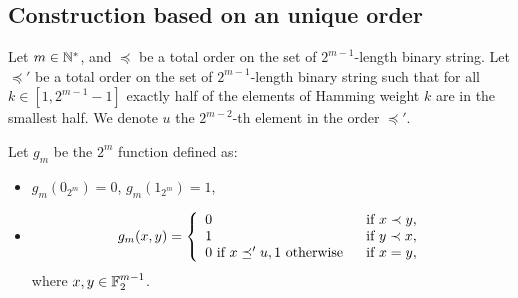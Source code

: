 \documentclass[11pt]{llncs}
\begin{document}
\subsection{Construction based on an unique order}

\begin{definition}\label{def:orderWPB2}
	Let $m\in \mathbb{N}^*$, and $\preceq$ be a total order on the set of $2^{m-1}$-length binary string. 
	Let $\preceq'$ be a total order on the set of $2^{m-1}$-length binary string such that for all $k\in [1,2^{m-1}-1]$ exactly half of the elements of Hamming weight $k$ are in the smallest half. 
	We denote $u$ the $2^{m-2}$-th element in the order $\preceq'$.
	
	Let $g_m$ be the $2^m$ function defined as:
	\begin{itemize}
		\item $g_m(0_{2^m})=0$, $g_m(1_{2^m})=1$,
		\item 	\[g_m(x,y)= \left \{
		\begin{array}{l l}
		0   & \text{ if }  x \prec y,\\
		1   & \text{ if }  y \prec x,\\
		0 \text{ if } x\preceq' u, 1 \text{ otherwise } & \text{ if }  x= y, \\
		\end{array}
		\right. \]
		where $x,y\in \mathbb{F}_2^{m-1}$.
	\end{itemize}
	
\end{definition}
\end{document}
